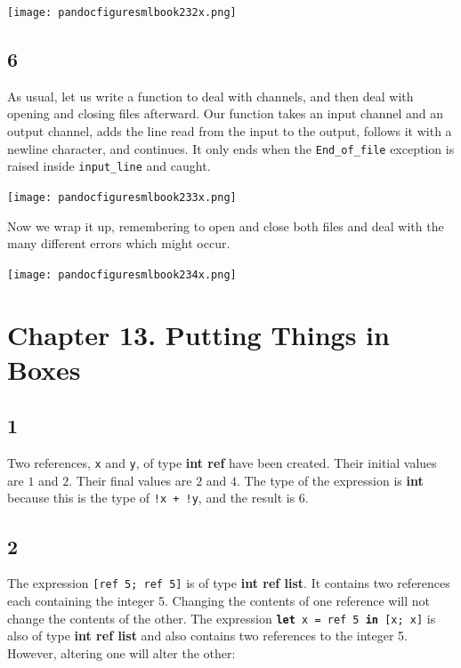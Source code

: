 \documentclass[]{book}
\begin{document}
\medskip
\begin{center}
\noindent\texttt{[image: pandocfiguresmlbook232x.png]}
\end{center}
\medskip

\subsection*{6}
As usual, let us write a function to deal with channels, and then deal with opening and closing files afterward. Our function takes an input channel and an output channel, adds the line read from the input to the output, follows it with a newline character, and continues. It only ends when the \texttt{End\_of\_file} exception is raised inside \texttt{input\_line} and caught.

\medskip
\begin{center}
\noindent\texttt{[image: pandocfiguresmlbook233x.png]}
\end{center}
\medskip

\noindent Now we wrap it up, remembering to open and close both files and deal with the many different errors which might occur.

\medskip
\begin{center}
\noindent\texttt{[image: pandocfiguresmlbook234x.png]}
\end{center}
\medskip


\section*{Chapter 13. Putting Things in Boxes}
\subsection*{1}
Two references, \texttt{x} and \texttt{y}, of type \textbf{\textsf{int ref}} have been created. Their initial values are $1$ and $2$. Their final values are $2$ and $4$. The type of the expression is \textsf{\textbf{int}} because this is the type of \texttt{!x + !y}, and the result is $6$.

\subsection*{2}
The expression \texttt{[ref 5; ref 5]} is of type \textbf{\textsf{int ref list}}. It contains two references each containing the integer 5. Changing the contents of one reference will not change the contents of the other. The expression \textbf{\texttt{let}}\texttt{ x = ref 5 }\textbf{\texttt{in}}\texttt{ [x; x]} is also of type \textbf{\textsf{int ref list}} and also contains two references to the integer 5. However, altering one will alter the other:
\end{document}
